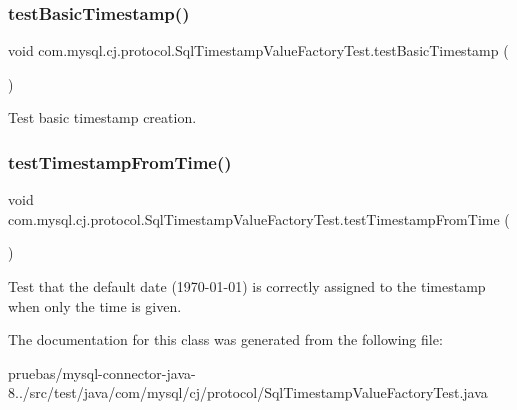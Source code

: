 \subsubsection{\texorpdfstring{test\+Basic\+Timestamp()}{testBasicTimestamp()}}
{\footnotesize\ttfamily void com.\+mysql.\+cj.\+protocol.\+Sql\+Timestamp\+Value\+Factory\+Test.\+test\+Basic\+Timestamp (\begin{DoxyParamCaption}{ }\end{DoxyParamCaption})}

Test basic timestamp creation. \mbox{\label{classcom_1_1mysql_1_1cj_1_1protocol_1_1_sql_timestamp_value_factory_test_af0a7b6505656f7c53014d514682a37a3}} 
\subsubsection{\texorpdfstring{test\+Timestamp\+From\+Time()}{testTimestampFromTime()}}
{\footnotesize\ttfamily void com.\+mysql.\+cj.\+protocol.\+Sql\+Timestamp\+Value\+Factory\+Test.\+test\+Timestamp\+From\+Time (\begin{DoxyParamCaption}{ }\end{DoxyParamCaption})}

Test that the default date (1970-\/01-\/01) is correctly assigned to the timestamp when only the time is given. 

The documentation for this class was generated from the following file\+:\begin{DoxyCompactItemize}
\item 
pruebas/mysql-\/connector-\/java-\/8../src/test/java/com/mysql/cj/protocol/Sql\+Timestamp\+Value\+Factory\+Test.\+java\end{DoxyCompactItemize}
